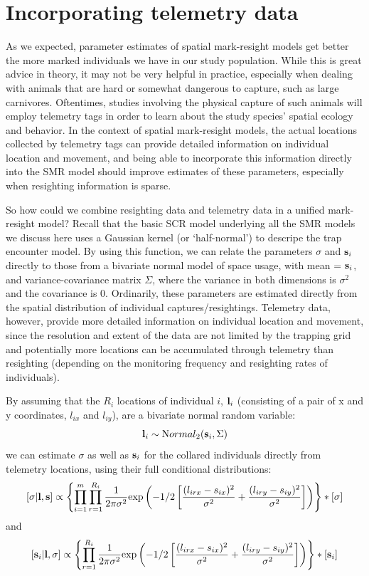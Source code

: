 \section{Incorporating telemetry data}
\label{partialID.sec.telemetry}
As we expected, parameter estimates of spatial mark-resight models get
better the more marked individuals we have in our study
population. While this is great advice in theory, it may not be very
helpful in practice, especially when dealing with animals that are
hard or somewhat dangerous to capture, such as large
carnivores. Oftentimes, studies involving the physical capture of such
animals will employ telemetry tags in order to learn about the study
species' spatial ecology and behavior. In the context of spatial
mark-resight models, the actual locations
collected by telemetry tags can provide detailed information on individual location and movement, and being able to incorporate this information directly into the SMR model should improve estimates of these parameters, especially when resighting information is sparse.

So how could we combine resighting data and telemetry data in a unified mark-resight model? Recall that the basic SCR model underlying all the SMR models we discuss here uses a Gaussian kernel (or `half-normal') to descripe the trap encounter model.
By using this function, we can relate the parameters $\sigma$ and ${\bf s}_{i}$ directly to those from a bivariate normal model of space usage, with mean = ${\bf s}_{i}$, and variance-covariance matrix $\Sigma$, where the variance in both dimensions is $\sigma^2$ and the covariance is 0. Ordinarily, these parameters are estimated directly from the spatial distribution of individual captures/resightings. Telemetry data, however, provide more detailed information on individual location and movement, since the resolution and extent of the data are not limited by the trapping grid and potentially more locations can be accumulated through telemetry than resighting (depending on the monitoring frequency and resighting rates of individuals).

By assuming that the $R_i$ locations of individual $i$, ${\bf l}_{i}$ (consisting of a pair of x and y coordinates, $l_{ix}$ and $l_{iy}$), are a bivariate normal random variable:
\[
{\bf l}_i\sim {\mbox Normal}_2 ({\bf s}_i,\Sigma)
\]
we can estimate $\sigma$ as well as ${\bf s}_{i}$ for the collared individuals directly from telemetry locations, using their full conditional distributions:
\[
[\sigma|{\bf l},{\bf s}] \propto \left\{\prod_{i=1}^m \prod_{r=1}^{R_{i}} \frac{1}{2 \pi \sigma^2} {\exp}\left(-1/2 \left[ \frac {(l_{irx}-s_{ix})^2} {\sigma^2} + \frac{(l_{iry}-s_{iy})^2}{\sigma^2} \right]\right)\right\}*[\sigma]
\]
and
\[
[{\bf s}_i|{\bf l},\sigma] \propto \left\{\prod_{r=1}^{R_{i}} \frac{1}{2 \pi \sigma^2} {\exp}\left(-1/2 \left[ \frac {(l_{irx}-s_{ix})^2} {\sigma^2} + \frac{(l_{iry}-s_{iy})^2}{\sigma^2} \right]\right)\right\}*[{\bf s}_{i}]
\]

